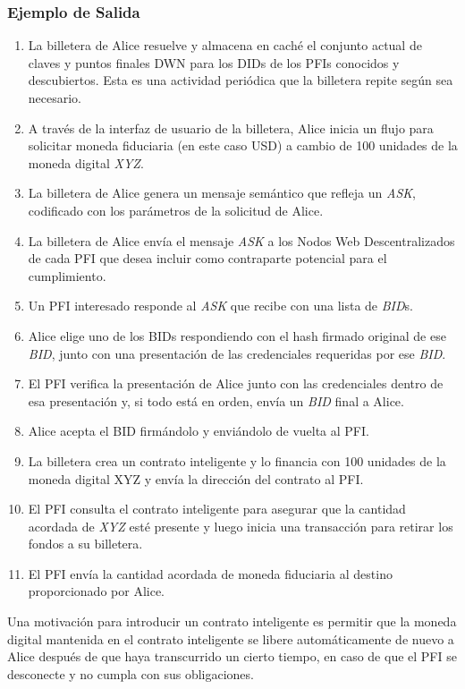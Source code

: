 \documentclass[11pt]{article}
\begin{document}
\subsubsection{Ejemplo de Salida}

\begin{enumerate}
	\item La billetera de Alice resuelve y almacena en caché el conjunto actual de claves y puntos finales DWN para los DIDs de los PFIs conocidos y descubiertos. Esta es una actividad periódica que la billetera repite según sea necesario.

	\item A través de la interfaz de usuario de la billetera, Alice inicia un flujo para solicitar moneda fiduciaria (en este caso USD) a cambio de 100 unidades de la moneda digital \textit{XYZ}.

	\item La billetera de Alice genera un mensaje semántico que refleja un \textit{ASK}, codificado con los parámetros de la solicitud de Alice.  

	\item La billetera de Alice envía el mensaje \textit{ASK} a los Nodos Web Descentralizados de cada PFI que desea incluir como contraparte potencial para el cumplimiento.

	\item Un PFI interesado responde al \textit{ASK} que recibe con una lista de \textit{BID}s. 

	\item Alice elige uno de los BIDs respondiendo con el hash firmado original de ese \textit{BID}, junto con una presentación de las credenciales requeridas por ese \textit{BID}. 

	\item El PFI verifica la presentación de Alice junto con las credenciales dentro de esa presentación y, si todo está en orden, envía un \textit{BID} final a Alice.

	\item Alice acepta el BID firmándolo y enviándolo de vuelta al PFI.

	\item La billetera crea un contrato inteligente y lo financia con 100 unidades de la moneda digital XYZ y envía la dirección del contrato al PFI.

	\item El PFI consulta el contrato inteligente para asegurar que la cantidad acordada de \textit{XYZ} esté presente y luego inicia una transacción para retirar los fondos a su billetera.

	\item El PFI envía la cantidad acordada de moneda fiduciaria al destino proporcionado por Alice.

\vspace{1\baselineskip}
\end{enumerate}
Una motivación para introducir un contrato inteligente es permitir que la moneda digital mantenida en el contrato inteligente se libere automáticamente de nuevo a Alice después de que haya transcurrido un cierto tiempo, en caso de que el PFI se desconecte y no cumpla con sus obligaciones.
\end{document}
